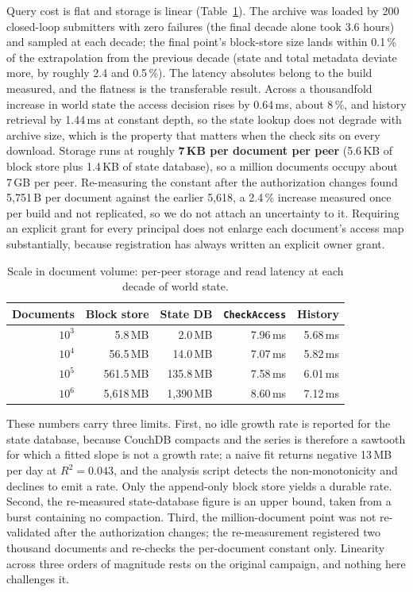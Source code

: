 \documentclass[preprint,12pt]{elsarticle}
\begin{document}
Query cost is flat and storage is linear (Table~\ref{tab:docscale}). The
archive was loaded by 200 closed-loop submitters with zero failures (the
final decade alone took 3.6 hours) and sampled at each decade; the final point's block-store size
lands within 0.1\,\% of the extrapolation from the previous decade (state
and total metadata deviate more, by roughly 2.4 and 0.5\,\%). The latency absolutes belong to
the build measured, and the flatness is the transferable result. Across a
thousandfold increase in world state the access decision rises by 0.64\,ms,
about 8\,\%, and history retrieval by 1.44\,ms at constant depth, so the
state lookup does not degrade with archive size, which is the property that
matters when the check sits on every download. Storage runs at roughly \textbf{7\,KB per document per
peer} (5.6\,KB of block store plus 1.4\,KB of state database), so a million
documents occupy about 7\,GB per peer. Re-measuring the constant after the
authorization changes found 5{,}751\,B per document against the earlier
5{,}618, a 2.4\,\% increase measured once per build and not replicated, so
we do not attach an uncertainty to it. Requiring an explicit grant for every
principal does not enlarge each document's access map substantially, because
registration has always written an explicit owner grant.

\begin{table}[!t]
\centering
\caption{Scale in document volume: per-peer storage and read latency at each
decade of world state.}
\label{tab:docscale}
\footnotesize
\setlength{\tabcolsep}{5pt}
\begin{tabular}{@{}rrrrr@{}}
\toprule
Documents & Block store & State DB & \texttt{CheckAccess} & History \\
\midrule
$10^3$ & 5.8\,MB     & 2.0\,MB     & 7.96\,ms & 5.68\,ms \\
$10^4$ & 56.5\,MB    & 14.0\,MB    & 7.07\,ms & 5.82\,ms \\
$10^5$ & 561.5\,MB   & 135.8\,MB   & 7.58\,ms & 6.01\,ms \\
$10^6$ & 5{,}618\,MB & 1{,}390\,MB & 8.60\,ms & 7.12\,ms \\
\bottomrule
\end{tabular}
\end{table}

These numbers carry three limits. First, no idle growth rate is reported
for the state database, because CouchDB compacts and the series is therefore a
sawtooth for which a fitted slope is not a growth rate; a naive fit returns
negative 13\,MB per day at $R^2 = 0.043$, and the analysis script detects the
non-monotonicity and declines to emit a rate. Only the append-only block store
yields a durable rate. Second, the re-measured state-database figure is an
upper bound, taken from a burst containing no compaction. Third, the
million-document point was not re-validated after the authorization changes; the
re-measurement registered two thousand documents and re-checks the
per-document constant only. Linearity across three orders of magnitude rests
on the original campaign, and nothing here challenges it.
\end{document}
